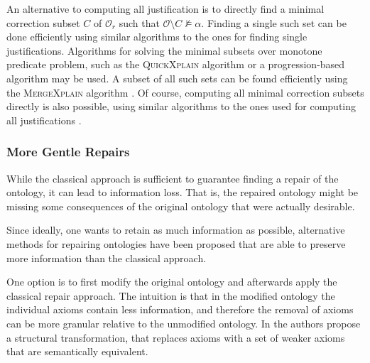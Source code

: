 An alternative to computing all justification is to directly find a minimal correction subset $C$ of $\mathcal{O}_r$ such that $\mathcal{O} \setminus C \not\vDash \alpha$. Finding a single such set can be done efficiently using similar algorithms to the ones for finding single justifications. Algorithms for solving the minimal subsets over monotone predicate problem, such as the \textsc{QuickXplain} algorithm \cite{junker2004preferred} or a progression-based algorithm \cite{marques2013minimal} may be used. A subset of all such sets can be found efficiently using the \textsc{MergeXplain} algorithm \cite{shchekotykhin2015mergexplain}. Of course, computing all minimal correction subsets directly is also possible, using similar algorithms to the ones used for computing all justifications \cite{malouf2007maximal}.

\subsubsection{More Gentle Repairs} \label{more-gentle-repairs}

While the classical approach is sufficient to guarantee finding a repair of the ontology, it can lead to information loss. That is, the repaired ontology might be missing some consequences of the original ontology that were actually desirable.

\begin{example}
\end{example}

Since ideally, one wants to retain as much information as possible, alternative methods for repairing ontologies have been proposed that are able to preserve more information than the classical approach.

One option is to first modify the original ontology and afterwards apply the classical repair approach. The intuition is that in the modified ontology the individual axioms contain less information, and therefore the removal of axioms can be more granular relative to the unmodified ontology. In \cite{horridge2008laconic} the authors propose a structural transformation, that replaces axioms with a set of weaker axioms that are semantically equivalent.

\begin{example}
\end{example}

